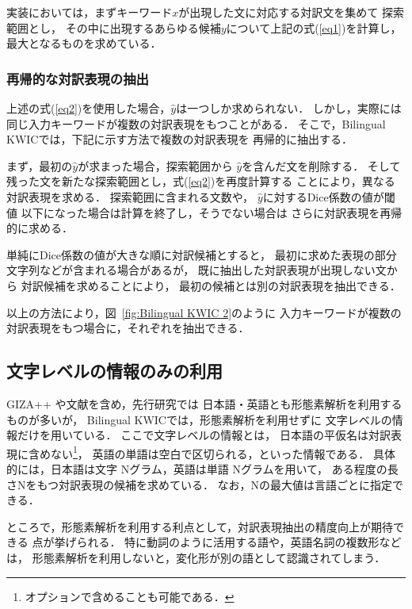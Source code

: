 \documentclass[japanese]{jnlp_1.4}
\begin{document}
実装においては，まずキーワード$x$が出現した文に対応する対訳文を集めて
探索範囲とし，
その中に出現するあらゆる候補$y$について上記の式(\ref{eq1})を計算し，
最大となるものを求めている．


\subsubsection{再帰的な対訳表現の抽出}
\label{sec:recursive}

上述の式(\ref{eq2})を使用した場合，$\hat{y}$は一つしか求められない．
しかし，実際には同じ入力キーワードが複数の対訳表現をもつことがある．
そこで，Bilingual KWICでは，下記に示す方法で複数の対訳表現を
再帰的に抽出する．

まず，最初の$\hat{y}$が求まった場合，探索範囲から
$\hat{y}$を含んだ文を削除する．
そして残った文を新たな探索範囲とし，式(\ref{eq2})を再度計算する
ことにより，異なる対訳表現を求める．
探索範囲に含まれる文数や，
$\hat{y}$に対するDice係数の値が閾値
以下になった場合は計算を終了し，そうでない場合は
さらに対訳表現を再帰的に求める．

単純にDice係数の値が大きな順に対訳候補とすると，
最初に求めた表現の部分文字列などが含まれる場合があるが，
既に抽出した対訳表現が出現しない文から
対訳候補を求めることにより，
最初の候補とは別の対訳表現を抽出できる．

以上の方法により，図~\ref{fig:Bilingual KWIC 2}のように
入力キーワードが複数の対訳表現をもつ場合に，それぞれを抽出できる．


\subsection{文字レベルの情報のみの利用}

GIZA++ や文献\cite{Kitamura97}を含め，先行研究では
日本語・英語とも形態素解析を利用するものが多いが，
Bilingual KWICでは，形態素解析を利用せずに
文字レベルの情報だけを用いている．
ここで文字レベルの情報とは，
日本語の平仮名は対訳表現に含めない\hspace{0pt}\footnote{オプションで含めることも可能である．}，
英語の単語は空白で区切られる，といった情報である．
具体的には，日本語は文字 Nグラム，英語は単語 Nグラムを用いて，
ある程度の長さNをもつ対訳表現の候補を求めている．
なお，Nの最大値は言語ごとに指定できる．

ところで，形態素解析を利用する利点として，対訳表現抽出の精度向上が期待できる
点が挙げられる．
特に動詞のように活用する語や，英語名詞の複数形などは，
形態素解析を利用しないと，変化形が別の語として認識されてしまう．
\end{document}

